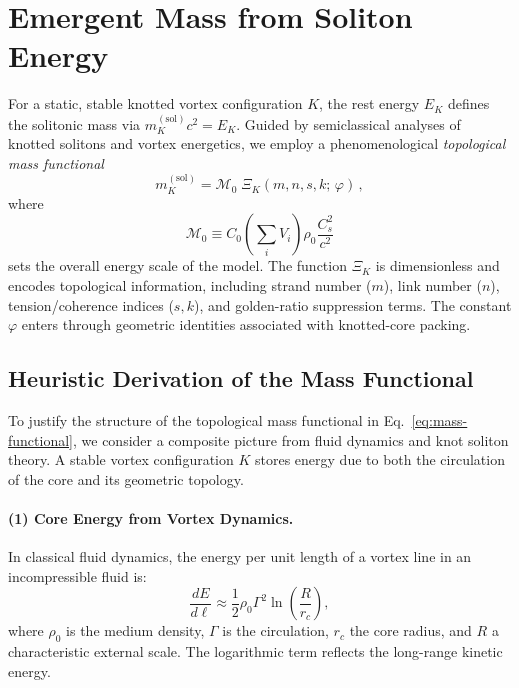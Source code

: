 \documentclass[12pt]{article}
\begin{document}
    \section{Emergent Mass from Soliton Energy}

    For a static, stable knotted vortex configuration $K$, the rest energy $E_K$ defines the solitonic mass via $m_K^{(\mathrm{sol})} c^2 = E_K$. Guided by semiclassical analyses of knotted solitons \cite{Faddeev1997} and vortex energetics, we employ a phenomenological \emph{topological mass functional}
    \begin{equation}
        m_K^{(\mathrm{sol})}
        = \mathcal{M}_0 \; \Xi_K(m,n,s,k;\,\varphi)\,,
        \label{eq:mass-functional}
    \end{equation}
    where
    \begin{equation}
        \mathcal{M}_0 \equiv C_0 \left(\sum_i V_i\right) \rho_0 \frac{C_s^2}{c^2}
    \end{equation}
    sets the overall energy scale of the model. The function $\Xi_K$ is dimensionless and encodes topological information, including strand number ($m$), link number ($n$), tension/coherence indices ($s, k$), and golden-ratio suppression terms. The constant $\varphi$ enters through geometric identities associated with knotted-core packing.

    \subsection{Heuristic Derivation of the Mass Functional}

    To justify the structure of the topological mass functional in Eq.~\eqref{eq:mass-functional}, we consider a composite picture from fluid dynamics and knot soliton theory. A stable vortex configuration $K$ stores energy due to both the circulation of the core and its geometric topology.

    \vspace{0.5em}
    \paragraph{(1) Core Energy from Vortex Dynamics.}
    In classical fluid dynamics, the energy per unit length of a vortex line in an incompressible fluid is:
    \begin{equation}
        \frac{dE}{d\ell} \approx \frac{1}{2} \rho_0 \Gamma^2 \ln\left(\frac{R}{r_c}\right),
    \end{equation}
    where $\rho_0$ is the medium density, $\Gamma$ is the circulation, $r_c$ the core radius, and $R$ a characteristic external scale. The logarithmic term reflects the long-range kinetic energy.
\end{document}
